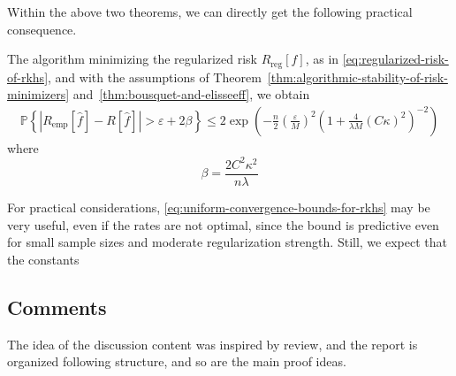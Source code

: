 Within the above two theorems, we can directly get the following practical consequence.
\begin{corollary}
	The algorithm minimizing the regularized risk $R_{\text{reg}}[f]$, as in \eqref{eq:regularized-risk-of-rkhs}, and with the assumptions of Theorem~\ref{thm:algorithmic-stability-of-risk-minimizers} and~\ref{thm:bousquet-and-elisseeff}, we obtain
	\begin{eqnarray}
		\label{eq:uniform-convergence-bounds-for-rkhs}
		\mathbb{P}\left\{\left|R_{\text{emp}}[\hat{f}]-R[\hat{f}]\right|>\varepsilon+2\beta\right\}\leq 2\exp\left(-\frac{n}{2}\left(\frac{\varepsilon}{M}\right)^{2}\left(1+\frac{4}{\lambda M}(C \kappa)^{2}\right)^{-2}\right)
	\end{eqnarray}
	where
	\begin{equation*}
		\beta=\frac{2C^{2}\kappa^{2}}{n\lambda}
	\end{equation*}
\end{corollary}

\begin{remark}
	For practical considerations, \eqref{eq:uniform-convergence-bounds-for-rkhs} may be very useful, even if the rates are not optimal, since the bound is predictive even for small sample sizes and moderate regularization strength. Still, we expect that the constants
\end{remark}

\subsection*{Comments}

The idea of the discussion content was inspired by \cite[Section 3]{hofmann2008kernel} review, and the report is organized following \cite[Chapter 12]{scholkopf2002learning} structure, and so are the main proof ideas.

\printbibliography[heading=subbibliography]
